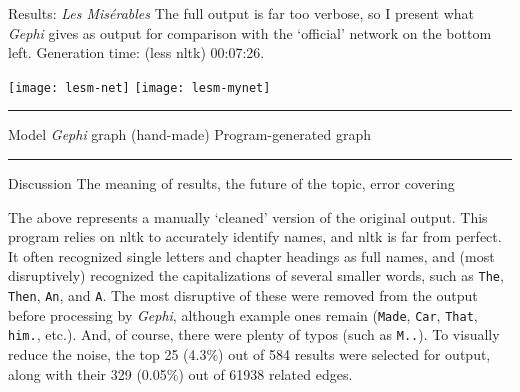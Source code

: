 \documentclass{beamer}
\newcommand{\Gephi}{\textit{Gephi}\xspace}
\begin{document}
\begin{frame}[t,fragile]{}
\begin{columns}
    \begin{column}{.45\textwidth}


      \begin{block}{Results: \textit{Les Mis\'erables}}
        The full output is far too verbose, so I present what \Gephi
        gives as output for comparison with the `official' network on
        the bottom left.  Generation time: (less \ac{nltk}) 00:07:26.

        \begin{centering}
          \texttt{[image: lesm-net]}
          \texttt{[image: lesm-mynet]}\\
          \rule{3.5cm}{0cm}Model \Gephi graph (hand-made) \hfill
          Program-generated graph\rule{4cm}{0cm}
        \end{centering}

      \end{block}

      \begin{block}{Discussion} 
        The meaning of results, the future of the topic, error covering

        The above represents a manually `cleaned' version of the
        original output.  This program relies on \ac{nltk} to
        accurately identify names, and \ac{nltk} is far from perfect.
        It often recognized single letters and chapter headings as
        full names, and (most disruptively) recognized the
        capitalizations of several smaller words, such as
        \texttt{The}, \texttt{Then}, \texttt{An}, and \texttt{A}.  The
        most disruptive of these were removed from the output before
        processing by \Gephi, although example ones remain
        (\texttt{Made}, \texttt{Car}, \texttt{That}, \texttt{him.},
        etc.).  And, of course, there were plenty of typos (such as
        \texttt{M..}).  To visually reduce the noise, the top 25
        (4.3\%) out of 584 results were selected for output, along
        with their 329 (0.05\%) out of 61938 related edges.


\end{block}
\end{column}
\end{columns}
\end{frame}
\end{document}

